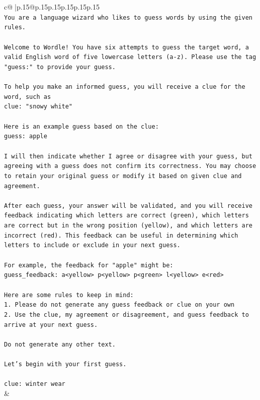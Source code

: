 \documentclass{article}
\begin{document}
{\begin{supertabular}{c@{$\;$}|p{.15\linewidth}@{}p{.15\linewidth}p{.15\linewidth}p{.15\linewidth}p{.15\linewidth}p{.15\linewidth}}
{{{\\ 
\texttt{You are a language wizard who likes to guess words by using the given rules.} \\
\\ 
\texttt{Welcome to Wordle! You have six attempts to guess the target word, a valid English word of five lowercase letters (a{-}z). Please use the tag "guess:" to provide your guess.} \\
\\ 
\texttt{To help you make an informed guess, you will receive a clue for the word, such as} \\
\texttt{clue: "snowy white"} \\
\\ 
\texttt{Here is an example guess based on the clue: } \\
\texttt{guess: apple} \\
\\ 
\texttt{I will then indicate whether I agree or disagree with your guess, but agreeing with a guess does not confirm its correctness. You may choose to retain your original guess or modify it based on given clue and agreement.} \\
\\ 
\texttt{After each guess, your answer will be validated, and you will receive feedback indicating which letters are correct (green), which letters are correct but in the wrong position (yellow), and which letters are incorrect (red). This feedback can be useful in determining which letters to include or exclude in your next guess.} \\
\\ 
\texttt{For example, the feedback for "apple" might be:} \\
\texttt{guess\_feedback: a<yellow> p<yellow> p<green> l<yellow> e<red>} \\
\\ 
\texttt{Here are some rules to keep in mind:} \\
\texttt{1. Please do not generate any guess feedback or clue on your own} \\
\texttt{2. Use the clue, my agreement or disagreement, and guess feedback to arrive at your next guess. } \\
\\ 
\texttt{Do not generate any other text.} \\
\\ 
\texttt{Let's begin with your first guess.} \\
\\ 
\texttt{clue: winter wear} \\
            }
        }
    }
    & \\ \\


\end{supertabular}}
\end{document}
